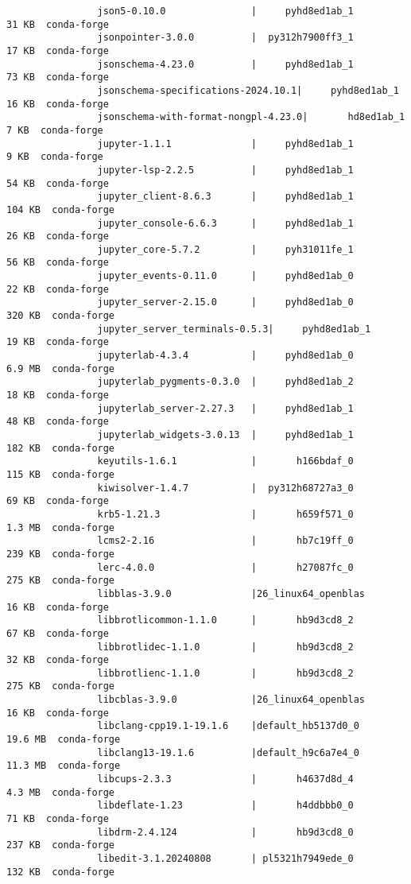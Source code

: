 \documentclass{article}
\begin{document}
\begin{itemize}
\begin{itemize}
\begin{itemize}
\begin{verbatim}
				json5-0.10.0               |     pyhd8ed1ab_1          31 KB  conda-forge
				jsonpointer-3.0.0          |  py312h7900ff3_1          17 KB  conda-forge
				jsonschema-4.23.0          |     pyhd8ed1ab_1          73 KB  conda-forge
				jsonschema-specifications-2024.10.1|     pyhd8ed1ab_1          16 KB  conda-forge
				jsonschema-with-format-nongpl-4.23.0|       hd8ed1ab_1           7 KB  conda-forge
				jupyter-1.1.1              |     pyhd8ed1ab_1           9 KB  conda-forge
				jupyter-lsp-2.2.5          |     pyhd8ed1ab_1          54 KB  conda-forge
				jupyter_client-8.6.3       |     pyhd8ed1ab_1         104 KB  conda-forge
				jupyter_console-6.6.3      |     pyhd8ed1ab_1          26 KB  conda-forge
				jupyter_core-5.7.2         |     pyh31011fe_1          56 KB  conda-forge
				jupyter_events-0.11.0      |     pyhd8ed1ab_0          22 KB  conda-forge
				jupyter_server-2.15.0      |     pyhd8ed1ab_0         320 KB  conda-forge
				jupyter_server_terminals-0.5.3|     pyhd8ed1ab_1          19 KB  conda-forge
				jupyterlab-4.3.4           |     pyhd8ed1ab_0         6.9 MB  conda-forge
				jupyterlab_pygments-0.3.0  |     pyhd8ed1ab_2          18 KB  conda-forge
				jupyterlab_server-2.27.3   |     pyhd8ed1ab_1          48 KB  conda-forge
				jupyterlab_widgets-3.0.13  |     pyhd8ed1ab_1         182 KB  conda-forge
				keyutils-1.6.1             |       h166bdaf_0         115 KB  conda-forge
				kiwisolver-1.4.7           |  py312h68727a3_0          69 KB  conda-forge
				krb5-1.21.3                |       h659f571_0         1.3 MB  conda-forge
				lcms2-2.16                 |       hb7c19ff_0         239 KB  conda-forge
				lerc-4.0.0                 |       h27087fc_0         275 KB  conda-forge
				libblas-3.9.0              |26_linux64_openblas          16 KB  conda-forge
				libbrotlicommon-1.1.0      |       hb9d3cd8_2          67 KB  conda-forge
				libbrotlidec-1.1.0         |       hb9d3cd8_2          32 KB  conda-forge
				libbrotlienc-1.1.0         |       hb9d3cd8_2         275 KB  conda-forge
				libcblas-3.9.0             |26_linux64_openblas          16 KB  conda-forge
				libclang-cpp19.1-19.1.6    |default_hb5137d0_0        19.6 MB  conda-forge
				libclang13-19.1.6          |default_h9c6a7e4_0        11.3 MB  conda-forge
				libcups-2.3.3              |       h4637d8d_4         4.3 MB  conda-forge
				libdeflate-1.23            |       h4ddbbb0_0          71 KB  conda-forge
				libdrm-2.4.124             |       hb9d3cd8_0         237 KB  conda-forge
				libedit-3.1.20240808       | pl5321h7949ede_0         132 KB  conda-forge

\end{verbatim}
\end{itemize}
\end{itemize}
\end{itemize}
\end{document}
